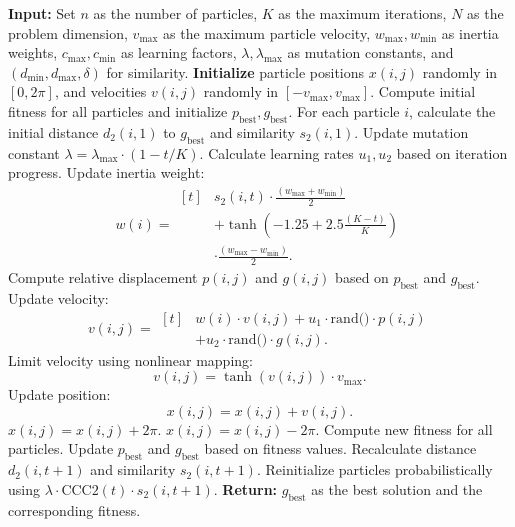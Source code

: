 \documentclass[lettersize,journal]{IEEEtran}
\begin{document}
\begin{algorithm}
  \caption{Improved PSO Algorithm}
  \begin{algorithmic}[1]
    \STATE \textbf{Input:} Set $n$ as the number of particles, $K$ as the maximum iterations, $N$ as the problem dimension, $v_{\text{max}}$ as the maximum particle velocity, $w_{\text{max}}, w_{\text{min}}$ as inertia weights, $c_{\text{max}}, c_{\text{min}}$ as learning factors, $\lambda, \lambda_{\text{max}}$ as mutation constants, and $(d_{\text{min}}, d_{\text{max}}, \delta)$ for similarity.
    \STATE \textbf{Initialize} particle positions $x(i,j)$ randomly in $[0, 2\pi]$, and velocities $v(i,j)$ randomly in $[-v_{\text{max}}, v_{\text{max}}]$.
    \STATE Compute initial fitness for all particles and initialize $p_{\text{best}}, g_{\text{best}}$.
    \STATE For each particle $i$, calculate the initial distance $d_2(i,1)$ to $g_{\text{best}}$ and similarity $s_2(i,1)$.
    \STATE Update mutation constant $\lambda = \lambda_{\text{max}} \cdot (1 - t/K)$.
    \STATE Calculate learning rates $u_1, u_2$ based on iteration progress.
    \STATE Update inertia weight:
    \[
      w(i) =
      \begin{aligned}[t]
         & s_2(i, t) \cdot \frac{(w_{\text{max}} + w_{\text{min}})}{2} \\
         & + \tanh\left(-1.25 + 2.5 \frac{(K - t)}{K}\right)           \\
         & \cdot \frac{(w_{\text{max}} - w_{\text{min}})}{2}.
      \end{aligned}
    \]
    \STATE Compute relative displacement $p(i,j)$ and $g(i,j)$ based on $p_{\text{best}}$ and $g_{\text{best}}$.
    \STATE Update velocity:
    \[
      v(i,j) =
      \begin{aligned}[t]
         & w(i) \cdot v(i,j) + u_1 \cdot \text{rand()} \cdot p(i,j) \\
         & + u_2 \cdot \text{rand()} \cdot g(i,j).
      \end{aligned}
    \]
    \STATE Limit velocity using nonlinear mapping:
    \[
      v(i,j) = \tanh(v(i,j)) \cdot v_{\text{max}}.
    \]
    \STATE Update position:
    \[
      x(i,j) = x(i,j) + v(i,j).
    \]
    \STATE $x(i,j) = x(i,j) + 2\pi$.
    \STATE $x(i,j) = x(i,j) - 2\pi$.
    \ENDIF
    \ENDFOR
    \ENDFOR
    \STATE Compute new fitness for all particles. Update $p_{\text{best}}$ and $g_{\text{best}}$ based on fitness values.
    \STATE Recalculate distance $d_2(i,t+1)$ and similarity $s_2(i,t+1)$.
    \STATE Reinitialize particles probabilistically using $\lambda \cdot \text{CCC2}(t) \cdot s_2(i,t+1)$.
    \ENDFOR
    \STATE \textbf{Return:} $g_{\text{best}}$ as the best solution and the corresponding fitness.
  \end{algorithmic}
\end{algorithm}
\end{document}
